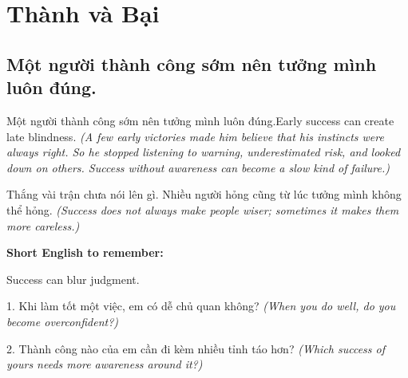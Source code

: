 \chapter{Thành và Bại}

\section{Một người thành công sớm nên tưởng mình luôn đúng.}
\begin{truyen}{Một người thành công sớm nên tưởng mình luôn đúng.}{Early success can create late blindness.}
\textit{(A few early victories made him believe that his instincts were always right. So he stopped listening to warning, underestimated risk, and looked down on others. Success without awareness can become a slow kind of failure.)}
\end{truyen}
\begin{baihoc}
Thắng vài trận chưa nói lên gì. Nhiều người hỏng cũng từ lúc tưởng mình không thể hỏng.
\textit{(Success does not always make people wiser; sometimes it makes them more careless.)}
\end{baihoc}
\begin{ghinhoanh}
\textbf{Short English to remember:}

Success can blur judgment.
\end{ghinhoanh}
\begin{tuhocnhanh}
1. Khi làm tốt một việc, em có dễ chủ quan không? \textit{(When you do well, do you become overconfident?)}

2. Thành công nào của em cần đi kèm nhiều tỉnh táo hơn? \textit{(Which success of yours needs more awareness around it?)}
\end{tuhocnhanh}
\ngancach

